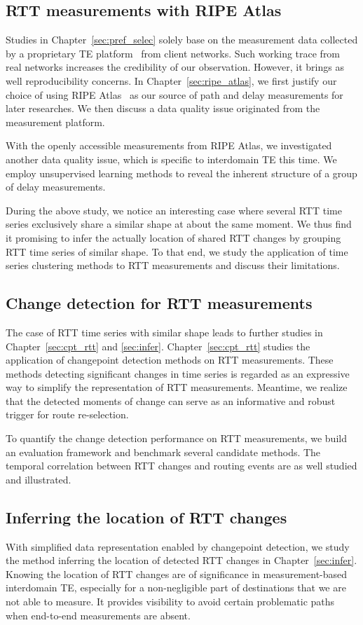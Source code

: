 \subsection{RTT measurements with RIPE Atlas}
Studies in Chapter~\ref{sec:pref_selec} solely base on the measurement data collected by a proprietary TE platform~\cite{b6} from client networks. Such working trace from real networks increases the credibility of our observation. However, it brings as well reproducibility concerns.
In Chapter~\ref{sec:ripe_atlas}, we first justify our choice of using RIPE Atlas~\cite{atlas} as our source of path and delay measurements for later researches.
We then discuss a data quality issue originated from the measurement platform.

With the openly accessible measurements from RIPE Atlas, we investigated another data quality issue, which is specific to interdomain TE this time. We employ unsupervised learning methods to reveal the inherent structure of a group of delay measurements.

During the above study, we notice an interesting case where several RTT time series exclusively share a similar shape at about the same moment.
We thus find it promising to infer the actually location of shared RTT changes by grouping RTT time series of similar shape. To that end, we study the application of time series clustering methods to RTT measurements and discuss their limitations.

\subsection{Change detection for RTT measurements}
The case of RTT time series with similar shape leads to further studies in Chapter~\ref{sec:cpt_rtt} and \ref{sec:infer}. Chapter~\ref{sec:cpt_rtt} studies the application of changepoint detection methods on RTT measurements. These methods detecting significant changes in time series is regarded as an expressive way to simplify the representation of RTT measurements. Meantime, we realize that the detected moments of change can serve as an informative and robust trigger for route re-selection.

To quantify the change detection performance on RTT measurements, we build an evaluation framework and benchmark several candidate methods.
The temporal correlation between RTT changes and routing events are as well studied and illustrated.

\subsection{Inferring the location of RTT changes}
With simplified data representation enabled by changepoint detection, we study the method inferring the location of detected RTT changes in Chapter~\ref{sec:infer}.
Knowing the location of RTT changes are of significance in measurement-based interdomain TE, especially for a non-negligible part of destinations that we are not able to measure. It provides visibility to avoid certain problematic paths when end-to-end measurements are absent.

